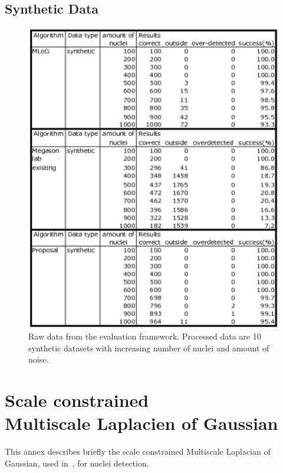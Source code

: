 \section{Synthetic Data}
\begin{figure}[H]
  \centering
  \includegraphics[width=1\textwidth]{pictures/evalTest}          
  \caption{Raw data from the evaluation framework. Processed data are 10 synthetic datasets with increasing number of nuclei and amount of noise.}
  \label{tab:syntheEvalRaw}
\end{figure}






\chapter{Scale constrained \\%
Multiscale Laplacien of Gaussian}
\label{annex:MLOG}
This annex describes briefly the scale constrained Multiscale Laplacian of Gaussian, used in~\cite{al2009improved}, for nuclei detection.


